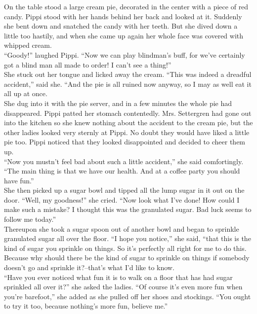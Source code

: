 \documentclass{standard}
\begin{document}
On the table stood a large cream pie, decorated in the center with a piece of red candy. Pippi stood with her hands behind her back and looked at it. Suddenly she bent down and snatched the candy with her teeth. But she dived down a little too hastily, and when she came up again her whole face was covered with whipped cream.\\

“Goody!” laughed Pippi. “Now we can play blindman’s buff, for we’ve certainly got a blind man all made to order! I can’t see a thing!”\\

She stuck out her tongue and licked away the cream. “This was indeed a dreadful accident,” said she. “And the pie is all ruined now anyway, so I may as well eat it all up at once.\\

She dug into it with the pie server, and in a few minutes the whole pie had disappeared. Pippi patted her stomach contentedly. Mrs. Settergren had gone out into the kitchen so she knew nothing about the accident to the cream pie, but the other ladies looked very sternly at Pippi. No doubt they would have liked a little pie too. Pippi noticed that they looked disappointed and decided to cheer them up.\\

“Now you mustn’t feel bad about such a little accident,” she said comfortingly. “The main thing is that we have our health. And at a coffee party you should have fun.”\\

She then picked up a sugar bowl and tipped all the lump sugar in it out on the door. “Well, my goodness!” she cried. “Now look what I’ve done! How could I make such a mistake? I thought this was the granulated sugar. Bad luck seems to follow me today.”\\

Thereupon she took a sugar spoon out of another bowl and began to sprinkle granulated sugar all over the floor. “I hope you notice,” she said, “that this is the kind of sugar you sprinkle on things. So it’s perfectly all right for me to do this. Because why should there be the kind of sugar to sprinkle on things if somebody doesn’t go and sprinkle it?--that’s what I’d like to know.\\

“Have you ever noticed what fun it is to walk on a floor that has had sugar sprinkled all over it?” she asked the ladies. “Of course it’s even more fun when you’re barefoot,” she added as she pulled off her shoes and stockings. “You ought to try it too, because nothing’s more fun, believe me.”\\
\end{document}
